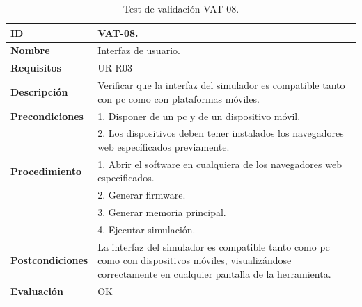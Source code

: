 \begin{center}
\begin{table}[htb]
\centering
\begin{tabular}{@{}p{2.5cm} p{9cm}@{}} 
\toprule
\textbf{ID} 					& VAT-08. \\
\midrule
\textbf{Nombre} 				& Interfaz de usuario. \\
\midrule
\textbf{Requisitos} 		& UR-R03\\
\midrule
\textbf{Descripción} 		& Verificar que la interfaz del simulador es compatible tanto con pc como con plataformas móviles. \\
\midrule
\textbf{Precondiciones}		& 1. Disponer de un pc y de un dispositivo móvil. \\
											& 2. Los dispositivos deben tener instalados los navegadores web específicados previamente. \\
\midrule
\textbf{Procedimiento}			& 1. Abrir el software en cualquiera de los navegadores web especificados. \\
							& 2. Generar firmware.\\
							& 3. Generar memoria principal.\\
							& 4. Ejecutar simulación.\\
\midrule
\textbf{Postcondiciones} 		&  La interfaz del simulador es compatible tanto como pc como con dispositivos móviles, visualizándose correctamente en cualquier pantalla de la herramienta.\\
\midrule
\textbf{Evaluación} 			& OK \\
\bottomrule
\end{tabular}
\caption{Test de validación VAT-08.}
\label{tab:vat-08}
\end{table}
\end{center}

